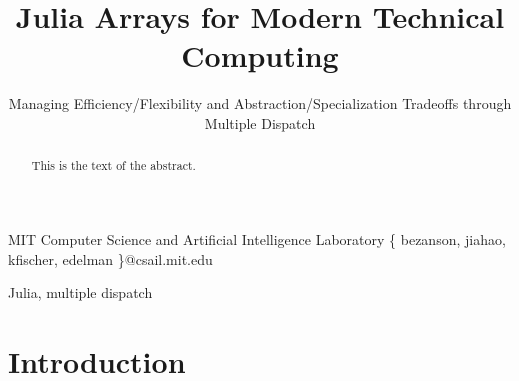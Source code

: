 \documentclass[preprint]{sigplanconf}
\begin{document}
\setlength{\pdfpageheight}{\paperheight}
\setlength{\pdfpagewidth}{\paperwidth}




\permissiontopublish             %



\title{Julia Arrays for Modern Technical Computing}
\subtitle{ Managing Efficiency/Flexibility and Abstraction/Specialization Tradeoffs through Multiple Dispatch}
           {MIT Computer Science and Artificial Intelligence Laboratory}
           {\{ bezanson, jiahao, kfischer, edelman \}@csail.mit.edu}


\maketitle

\begin{abstract}
This is the text of the abstract.
\end{abstract}


\keywords
Julia, multiple dispatch

\section{Introduction}
\end{document}
